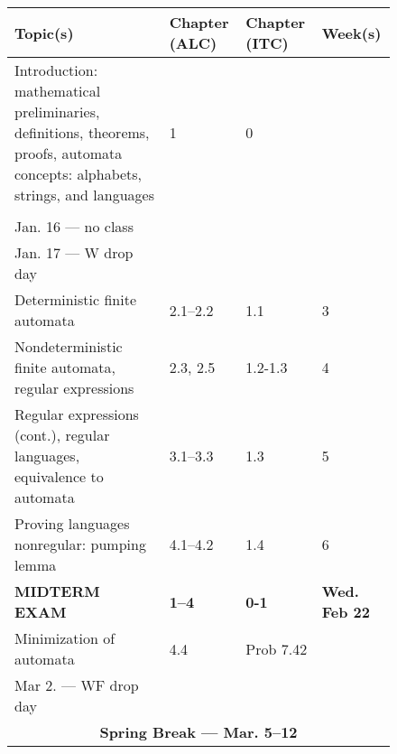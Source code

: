 \documentclass[11pt]{article}
\newenvironment{leftcell}
{
  \begin{minipage}{5cm}
}{
\end{minipage}
}
\begin{document}
\begin{figure}[H]
  \begin{tabular}{llll} %
        \toprule
        \textbf{Topic(s)} & \textbf{Chapter (ALC)} & \textbf{Chapter (ITC)} & \textbf{Week(s)} \\
        \midrule
        \begin{leftcell}
          Introduction: mathematical preliminaries, definitions,
          theorems, proofs, automata concepts: alphabets, strings, and
          languages
        \end{leftcell}
        & 1 & 0 &
        \begin{leftcell}
          1--2 \\\\
          Jan. 16 --- no class \\
          Jan. 17 --- W drop day
        \end{leftcell}
        \\
        \midrule
        Deterministic finite automata & 2.1--2.2 & 1.1 & 3 \\
        \midrule
        \begin{leftcell}
          Nondeterministic finite automata, regular expressions
        \end{leftcell}
        & 2.3,
        2.5 & 1.2-1.3 & 4 \\
        \midrule
        \begin{leftcell}
          Regular expressions (cont.), regular languages, equivalence to
          automata
        \end{leftcell}
        & 3.1--3.3 & 1.3 & 5 \\
        \midrule
        \begin{leftcell}
          Proving languages nonregular: pumping lemma
        \end{leftcell}
        &  4.1--4.2 & 1.4 & 6
        \\
        \midrule
        \textbf{MIDTERM EXAM} & \textbf{1--4} & \textbf{0-1} & \textbf{Wed. Feb 22}\\
        \midrule
        Minimization of automata  & 4.4  & Prob 7.42 &
        \begin{minipage}{3cm}
        8 \\
        Mar 2. --- WF drop day
        \end{minipage}
        \\
        \midrule
        \multicolumn{4}{c}{\textbf{Spring Break --- Mar. 5--12}}
        \\

\end{tabular}
\end{figure}
\end{document}
